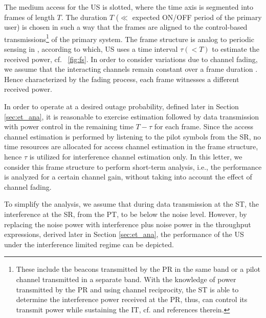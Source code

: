 \documentclass[12pt, draftclsnofoot, onecolumn]{IEEEtran}
\begin{document}
The medium access for the US is slotted, where the time axis is segmented into frames of length $T$. The duration $T$ ($\ll$ expected ON/OFF period of the primary user) is chosen in such a way that the frames are aligned to the control-based transmissions\footnote{These include the beacons transmitted by the PR in the same band or a pilot channel transmitted in a separate band. With the knowledge of power transmitted by the PR and using channel reciprocity, the ST is able to determine the interference power received at the PR, thus, can control its transmit power while sustaining the IT, cf. \cite{Kaushik15} and references therein.} of the primary system. The frame structure is analog to periodic sensing in \cite{Kaushik15}, according to which, US uses a time interval $\tau (< T)$ to estimate the received power, cf. \figurename~\ref{fig:fs}. In order to consider variations due to channel fading, we assume that the interacting channels remain constant over a frame duration \cite{Kaushik15}. Hence characterized by the fading process, each frame witnesses a different received power. 

In order to operate at a desired outage probability, defined later in Section \ref{sec:et_ana}, it is reasonable to exercise estimation followed by data transmission with power control in the remaining time $T - \tau$ for each frame. %
Since the access channel estimation is performed by listening to the pilot symbols from the SR, no time resources are allocated for access channel estimation in the frame structure, hence $\tau$ is utilized for interference channel estimation only. 
In this letter, we consider this frame structure to perform short-term analysis, i.e., the performance is analyzed for a certain channel gain, without taking into account the effect of channel fading.%



To simplify the analysis, we assume that during data transmission at the ST, the interference at the SR, from the PT, to be below the noise level. However, by replacing the noise power with interference plus noise power in the throughput expressions, derived later in Section \ref{sec:et_ana}, the performance of the US under the interference limited regime can be depicted. %
\end{document}
